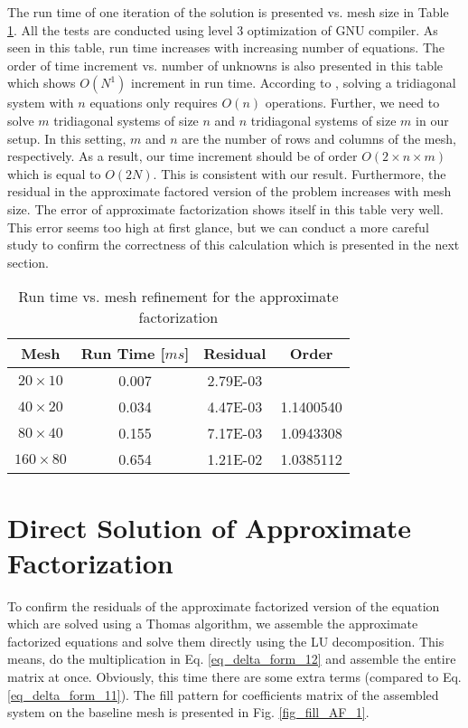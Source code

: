 \documentclass{article}
\begin{document}
The run time of one iteration of the solution is presented vs. mesh size in Table \ref{table_AF_1}. All the tests are conducted using level 3 optimization of GNU compiler. As seen in this table, run time increases with increasing number of equations. The order of time increment vs. number of unknowns is also presented in this table which shows $O(N^1)$ increment in run time. According to \cite{press2002numerical}, solving a tridiagonal system with $n$ equations only requires $O(n)$ operations. Further, we need to solve $m$ tridiagonal systems of size $n$ and $n$ tridiagonal systems of size $m$ in our setup. In this setting, $m$ and $n$ are the number of rows and columns of the mesh, respectively. As a result, our time increment should be of order $O(2\times n\times m)$ which is equal to $O(2  N)$. This is consistent with our result. Furthermore, the residual in the approximate factored version of the problem increases with mesh size. The error of approximate factorization shows itself in this table very well. This error seems too high at first glance, but we can conduct a more careful study to confirm the correctness of this calculation which is presented in the next section.

\begin{table}[H]
\centering
\caption{Run time vs. mesh refinement for the approximate factorization}
\label{table_AF_1}
\begin{tabular}{cccc}
\hline
Mesh & Run Time [$m s$] & Residual & Order\\
\hline\hline
$20 \times 10$  & 0.007 & 2.79E-03 &           \\
$40 \times 20$  & 0.034 & 4.47E-03 & 1.1400540 \\
$80 \times 40$  & 0.155 & 7.17E-03 & 1.0943308 \\
$160 \times 80$ & 0.654 & 1.21E-02 & 1.0385112 \\
\hline
\end{tabular}
\end{table}




\section{Direct Solution of Approximate Factorization}
To  confirm the residuals of the approximate factorized version of the equation which are solved using a Thomas algorithm, we assemble the approximate factorized equations and solve them directly using the LU decomposition. This means, do the multiplication in Eq. \ref{eq_delta_form_12} and assemble the entire matrix at once. Obviously, this time there are some extra terms (compared to Eq. \ref{eq_delta_form_11}). The fill pattern for coefficients matrix of the assembled system on the baseline mesh is presented in Fig. \ref{fig_fill_AF_1}.
\end{document}

